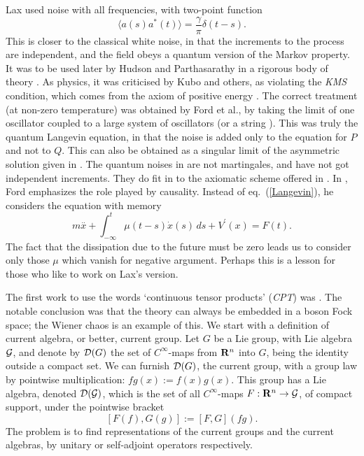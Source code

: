 Lax \cite{Lax} used noise with all frequencies, with two-point function
\[ \langle a(s)a^*(t)\rangle=\frac{\gamma}{\pi}\delta(t-s).\]
This is closer to the classical white noise, in that the increments to
the process are independent, and the field obeys a quantum version of
the Markov property. It was to be used
later by Hudson and Parthasarathy in a rigorous body of theory
\cite{Hudson3,Partha2}.
As physics, it was criticised by Kubo and others, as violating the
{\em KMS} condition, which comes from the
axiom of positive energy \cite{Haag}. The correct treatment (at
non-zero temperature) was obtained by Ford et al., \cite{Ford} by taking
the limit of one oscillator
coupled to a large system of oscillators (or a string \cite{Lewishb}).
This was truly the quantum Langevin equation, in that the noise is added
only to the equation for $P$ and not to $Q$. This can also be obtained
\cite{HLK} as a singular limit of the asymmetric solution given in
\cite{RFS5}. The quantum noises in \cite{Ford,RFS5} are not martingales,
and have not got independent increments. They do fit in to the axiomatic
scheme offered in \cite{Accardi}. In \cite{Ford2},
Ford emphasizes the role played by causality. Instead of eq.~(\ref{Langevin}),
he considers the equation with memory
\begin{equation}
m\stackrel{..}{x}+\int_{-\infty}^t \mu(t-s)\dot{x}(s)\,ds+V^\prime(x)=F(t).
\end{equation}
The fact that the dissipation due to the future must be zero leads us
to consider only those $\mu$ which vanish for negative argument.
Perhaps this is a lesson for
those \cite{ArakiW,Streater2,RFS3,HIK,Hudson3,Partha2} who like to work
on Lax's version. 

The first work to use the words `continuous
tensor products' ({\em CPT}) was \cite{ArakiW}. The notable conclusion was that the
theory can always be embedded in a boson Fock space; the Wiener chaos is an
example of this. We start with a definition of current algebra, or
better, current group. Let $G$ be a Lie group, with Lie algebra ${\cal G}$,
and denote by ${\cal D}(G)$ the set
of $C^\infty$-maps from ${\bf R}^n$ into $G$, being the identity outside
a compact set. We can furnish ${\cal D}(G)$, the current group,
with a group law by pointwise
multiplication: $fg(x):=f(x)g(x)$. This group has a Lie algebra, denoted
${\cal D}({\cal G})$, which is the set of
all $C^\infty$-maps $F:{\bf R}^n\rightarrow {\cal G}$, of compact support,
under the pointwise bracket
\cite{RFS3}
\[ [F(f),G(g)]:=[F,G](fg).\]
The problem is to find representations of the current groups and
the current algebras, by unitary or self-adjoint operators respectively.

